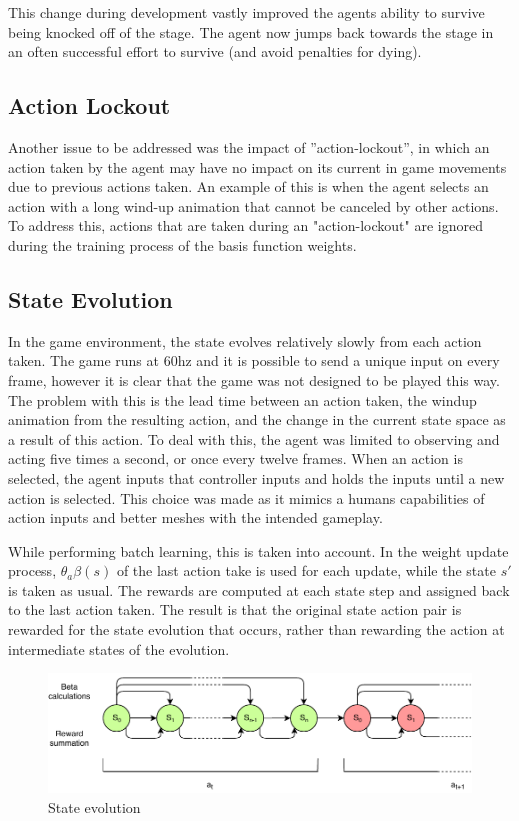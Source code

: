 This change during development vastly improved the agents ability to survive being knocked off of the stage. The agent now jumps back towards the stage in an often successful effort to survive (and avoid penalties for dying). 

\subsection{Action Lockout}
Another issue to be addressed was the impact of ”action-lockout”, in which an action taken by the agent may have no impact on its current in game movements due to previous actions taken. An example of this is when the agent selects an action with a long wind-up animation that cannot be canceled by other actions. To address this, actions that are taken during an "action-lockout" are ignored during the training process of the basis function weights. 

\subsection{State Evolution}
In the game environment, the state evolves relatively slowly from each action taken. The game runs at 60hz and it is possible to send a unique input on every frame, however it is clear that the game was not designed to be played this way. The problem with this is the lead time between an action taken, the windup animation from the resulting action, and the change in the current state space as a result of this action. To deal with this, the agent was limited to observing and acting five times a second, or once every twelve frames. When an action is selected, the agent inputs that controller inputs and holds the inputs until a new action is selected. This choice was made as it mimics a humans capabilities of action inputs and better meshes with the intended gameplay.

While performing batch learning, this is taken into account. In the weight update process, $\theta_a\beta(s)$ of the last action take is used for each update, while the state $s'$ is taken as usual. The rewards are computed at each state step and assigned back to the last action taken. The result is that the original state action pair is rewarded for the state evolution that occurs, rather than rewarding the action at intermediate states of the evolution. 

\begin{figure}[!htb]
	\centering
	\includegraphics[width=120mm]{stateevolution.pdf}
	\caption{State evolution}
\end{figure}

